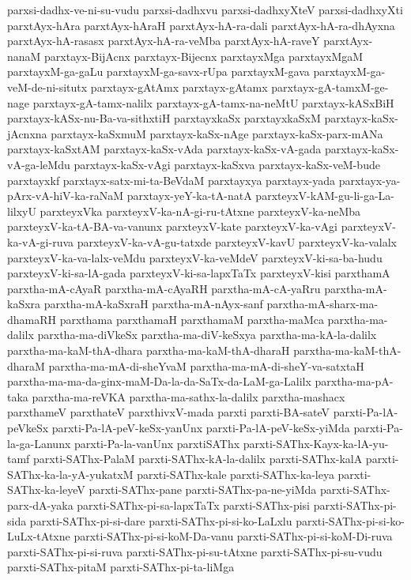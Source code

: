 {parxsi-dadhx-ve-ni-su-vudu
parxsi-dadhxvu
parxsi-dadhxyXteV
parxsi-dadhxyXti
parxtAyx-hAra
parxtAyx-hAraH
parxtAyx-hA-ra-dali
parxtAyx-hA-ra-dhAyxna
parxtAyx-hA-rasasx
parxtAyx-hA-ra-veMba
parxtAyx-hA-raveY
parxtAyx-nanaM
parxtayx-BijAcnx
parxtayx-Bijecnx
parxtayxMga
parxtayxMgaM
parxtayxM-ga-gaLu
parxtayxM-ga-savx-rUpa
parxtayxM-gava
parxtayxM-ga-veM-de-ni-situtx
parxtayx-gAtAmx
parxtayx-gAtamx
parxtayx-gA-tamxM-ge-nage
parxtayx-gA-tamx-nalilx
parxtayx-gA-tamx-na-neMtU
parxtayx-kASxBiH
parxtayx-kASx-nu-Ba-va-sithxtiH
parxtayxkaSx
parxtayxkaSxM
parxtayx-kaSx-jAcnxna
parxtayx-kaSxmuM
parxtayx-kaSx-nAge
parxtayx-kaSx-parx-mANa
parxtayx-kaSxtAM
parxtayx-kaSx-vAda
parxtayx-kaSx-vA-gada
parxtayx-kaSx-vA-ga-leMdu
parxtayx-kaSx-vAgi
parxtayx-kaSxva
parxtayx-kaSx-veM-bude
parxtayxkf
parxtayx-satx-mi-ta-BeVdaM
parxtayxya
parxtayx-yada
parxtayx-ya-pArx-vA-hiV-ka-raNaM
parxtayx-yeY-ka-tA-natA
parxteyxV-kAM-gu-li-ga-La-lilxyU
parxteyxVka
parxteyxV-ka-nA-gi-ru-tAtxne
parxteyxV-ka-neMba
parxteyxV-ka-tA-BA-va-vanunx
parxteyxV-kate
parxteyxV-ka-vAgi
parxteyxV-ka-vA-gi-ruva
parxteyxV-ka-vA-gu-tatxde
parxteyxV-kavU
parxteyxV-ka-valalx
parxteyxV-ka-va-lalx-veMdu
parxteyxV-ka-veMdeV
parxteyxV-ki-sa-ba-hudu
parxteyxV-ki-sa-lA-gada
parxteyxV-ki-sa-lapxTaTx
parxteyxV-kisi
parxthamA
parxtha-mA-cAyaR
parxtha-mA-cAyaRH
parxtha-mA-cA-yaRru
parxtha-mA-kaSxra
parxtha-mA-kaSxraH
parxtha-mA-nAyx-sanf
parxtha-mA-sharx-ma-dhamaRH
parxthama
parxthamaH
parxthamaM
parxtha-maMca
parxtha-ma-dalilx
parxtha-ma-diVkeSx
parxtha-ma-diV-keSxya
parxtha-ma-kA-la-dalilx
parxtha-ma-kaM-thA-dhara
parxtha-ma-kaM-thA-dharaH
parxtha-ma-kaM-thA-dharaM
parxtha-ma-mA-di-sheYvaM
parxtha-ma-mA-di-sheY-va-satxtaH
parxtha-ma-ma-da-ginx-maM-Da-la-da-SaTx-da-LaM-ga-Lalilx
parxtha-ma-pA-taka
parxtha-ma-reVKA
parxtha-ma-sathx-la-dalilx
parxtha-mashacx
parxthameV
parxthateV
parxthivxV-mada
parxti
parxti-BA-sateV
parxti-Pa-lA-peVkeSx
parxti-Pa-lA-peV-keSx-yanUnx
parxti-Pa-lA-peV-keSx-yiMda
parxti-Pa-la-ga-Lanunx
parxti-Pa-la-vanUnx
parxtiSAThx
parxti-SAThx-Kayx-ka-lA-yu-tamf
parxti-SAThx-PalaM
parxti-SAThx-kA-la-dalilx
parxti-SAThx-kalA
parxti-SAThx-ka-la-yA-yukatxM
parxti-SAThx-kale
parxti-SAThx-ka-leya
parxti-SAThx-ka-leyeV
parxti-SAThx-pane
parxti-SAThx-pa-ne-yiMda
parxti-SAThx-parx-dA-yaka
parxti-SAThx-pi-sa-lapxTaTx
parxti-SAThx-pisi
parxti-SAThx-pi-sida
parxti-SAThx-pi-si-dare
parxti-SAThx-pi-si-ko-LaLxlu
parxti-SAThx-pi-si-ko-LuLx-tAtxne
parxti-SAThx-pi-si-koM-Da-vanu
parxti-SAThx-pi-si-koM-Di-ruva
parxti-SAThx-pi-si-ruva
parxti-SAThx-pi-su-tAtxne
parxti-SAThx-pi-su-vudu
parxti-SAThx-pitaM
parxti-SAThx-pi-ta-liMga
}
